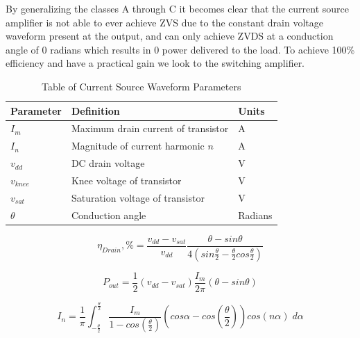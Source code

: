 By generalizing the classes A through C it becomes clear that the current source amplifier is not able to ever achieve ZVS due to the constant drain voltage waveform present at the output, and can only achieve ZVDS at a conduction angle of 0 radians  which results in 0 power delivered to the load. To achieve 100\% efficiency and have a practical gain we look to the switching amplifier.

\begin{table}
    \caption{Table of Current Source Waveform Parameters}
    \label{table:waveform_param}
        \begin{center}
            \begin{tabular}{|l|l|l|}
              \hline
              Parameter & Definition & Units\\ \hline
              $I_m$ & Maximum drain current of transistor & A \\ \hline
              $I_n$ & Magnitude of current harmonic $n$ & A \\ \hline
              $v_{dd}$ & DC drain voltage & V\\ \hline
              $v_{knee}$ & Knee voltage of transistor & V\\ \hline
              $v_{sat}$ & Saturation voltage of transistor & V \\ \hline
              $\theta$ & Conduction angle & Radians\\ \hline

            \end{tabular}
        \end{center}
\end{table}

\begin{equation}\label{eq:cond_eff}
  \eta_{Drain}, \% = \frac{v_{dd} - v_{sat}}{v_{dd}} \frac{\theta - sin\theta}{4(sin\frac{\theta}{2} - \frac{\theta}{2} cos\frac{\theta}{2}) }
\end{equation}

\begin{equation}\label{eq:cond_pout}
  P_{out} = \frac{1}{2}(v_{dd} - v_{sat} )\frac{I_m}{2\pi}(\theta - sin\theta)
\end{equation}

\begin{equation}\label{eq:cond_current}
  I_n = \frac{1}{\pi}\int_{-\frac{\theta}{2}}^{\frac{\theta}{2}} \frac{I_m}{1 - cos(\frac{\theta}{2})} (cos\alpha - cos(\frac{\theta}{2}))cos(n\alpha) \; d\alpha
\end{equation}

